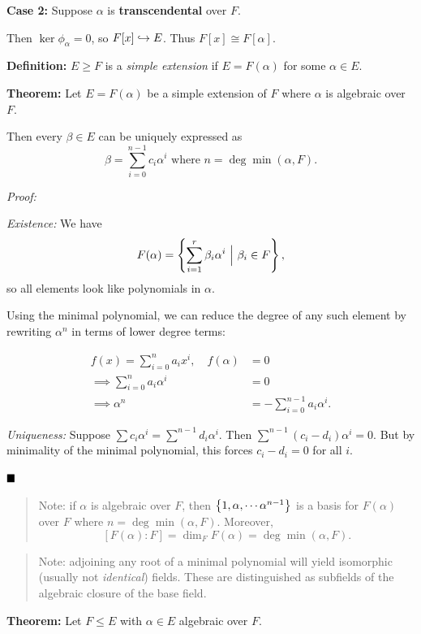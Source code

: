 \textbf{Case 2:} Suppose \(\alpha\) is \textbf{transcendental} over
\(F\).

Then \(\ker \phi_\alpha = 0\), so \(F[x] \hookrightarrow E\). Thus
\(F[x] \cong F[\alpha]\).

\textbf{Definition:} \(E \geq F\) is a \emph{simple extension} if
\(E = F(\alpha)\) for some \(\alpha \in E\).

\textbf{Theorem:} Let \(E = F(\alpha)\) be a simple extension of \(F\)
where \(\alpha\) is algebraic over \(F\).

Then every \(\beta \in E\) can be uniquely expressed as \[
\beta = \sum_{i=0}^{n-1} c_i \alpha^i \text{ where } n = \deg \min(\alpha, F)
.\]

\emph{Proof:}

\emph{Existence:} We have \[
F(\alpha) = \left\{{\sum_{i=1}^r \beta_i \alpha^i {~\mathrel{\Big|}~} \beta_i \in F}\right\}
,\] so all elements look like polynomials in \(\alpha\).

Using the minimal polynomial, we can reduce the degree of any such
element by rewriting \(\alpha^n\) in terms of lower degree terms:

\begin{align*}
f(x) = \sum_{i=0}^n a_i x^i, \quad f(\alpha) &= 0 \\
\implies \sum_{i=0}^n a_i \alpha^i &= 0 \\
\implies \alpha^n &= -\sum_{i=0}^{n-1} a_i \alpha^i
.\end{align*}

\emph{Uniqueness:} Suppose
\(\sum c_i \alpha^i = \sum^{n-1} d_i \alpha^i\). Then
\(\sum^{n-1} (c_i - d_i) \alpha^i = 0\). But by minimality of the
minimal polynomial, this forces \(c_i - d_i = 0\) for all \(i\).

\(\qed\)

\begin{quote}
Note: if \(\alpha\) is algebraic over \(F\), then
\(\left\{{1, \alpha, \cdots \alpha^{n-1}}\right\}\) is a basis for \(F(\alpha)\)
over \(F\) where \(n = \deg \min(\alpha, F)\). Moreover, \[
[F(\alpha):F] = \dim_F F(\alpha) = \deg\min(\alpha, F)
.\]
\end{quote}

\begin{quote}
Note: adjoining any root of a minimal polynomial will yield isomorphic
(usually not \emph{identical}) fields. These are distinguished as
subfields of the algebraic closure of the base field.
\end{quote}

\textbf{Theorem:} Let \(F \leq E\) with \(\alpha \in E\) algebraic over
\(F\).

